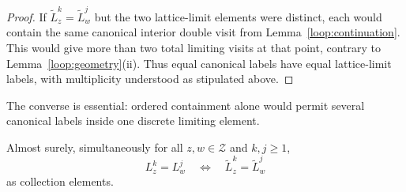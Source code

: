 \begin{proof}
If $\widetilde L_z^k=\widetilde L_w^j$ but the two lattice-limit
elements were distinct, each would contain the same canonical
interior double visit from Lemma~\ref{loop:continuation}.  This would
give more than two total limiting visits at that point, contrary to
Lemma~\ref{loop:geometry}(ii).  Thus equal canonical labels have equal
lattice-limit labels, with multiplicity understood as stipulated above.
\end{proof}

The converse is essential: ordered containment alone would permit
several canonical labels inside one discrete limiting element.

\begin{lemma}
\label{loop:label-equivalence}
Almost surely, simultaneously for all $z,w\in\mathcal Z$ and
$k,j\ge1$,
\begin{equation}\label{loop:label-iff}
 L_z^k=L_w^j
 \quad\Longleftrightarrow\quad
 \widetilde L_z^k=\widetilde L_w^j
\end{equation}
as collection elements.
\end{lemma}

